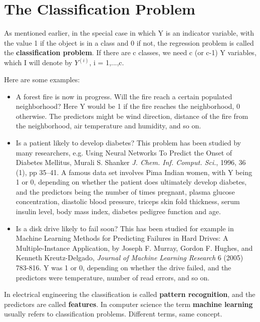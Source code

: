\section{The Classification Problem}
\label{class}

As mentioned earlier, in the special case in which Y is an indicator
variable, with the value 1 if the object is in a class and 0 if not, the
regression problem is called the {\bf classification problem}.  
If there are c classes, we need c (or c-1) Y variables, which I will 
denote by $Y^{(i)}$, i = 1,...,c.

Here are some examples:

\begin{itemize}

\item A forest fire is now in progress.  Will the fire reach a certain
populated neighborhood?  Here Y would be 1 if the fire reaches the
neighborhood, 0 otherwise.  The predictors might be wind direction,
distance of the fire from the neighborhood, air temperature and
humidity, and so on.

\item Is a patient likely to develop diabetes?  This problem has been
studied by many researchers, e.g.  Using Neural Networks To Predict the
Onset of Diabetes Mellitus, Murali S. Shanker {\it J. Chem. Inf. Comput.
Sci.}, 1996, 36 (1), pp 35–41.  A famous data set involves Pima Indian
women, with Y being 1 or 0, depending on whether the patient does
ultimately develop diabetes, and the predictors being the number of
times pregnant, plasma glucose concentration, diastolic blood pressure,
triceps skin fold thickness, serum insulin level, body mass index,
diabetes pedigree function and age. 

\item Is a disk drive likely to fail soon?  This has been studied for
example in Machine Learning Methods for Predicting Failures in Hard
Drives: A Multiple-Instance Application, by Joseph F. Murray, Gordon F.
Hughes, and Kenneth Kreutz-Delgado, {\it Journal of Machine Learning
Research} 6 (2005) 783-816.  Y was 1 or 0, depending on whether the
drive failed, and the predictors were temperature, number of read
errors, and so on.

\end{itemize}

In electrical engineering the classification is called {\bf pattern
recognition}, and the predictors are called {\bf features}.  In computer
science the term {\bf machine learning} usually refers to classification
problems.  Different terms, same concept.

